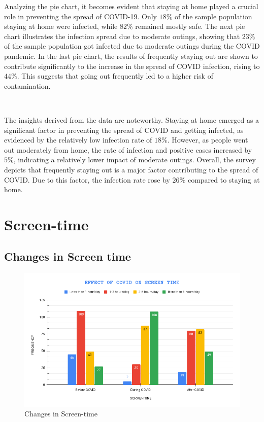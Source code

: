 \newpage 

Analyzing the pie chart, it becomes evident that staying at home played a crucial role in preventing the spread of COVID-19. Only $18\%$ of the sample population staying at home were infected, while $82\%$ remained mostly safe. The next pie chart illustrates the infection spread due to moderate outings, showing that $23\%$ of the sample population got infected due to moderate outings during the COVID pandemic. In the last pie chart, the results of frequently staying out are shown to contribute significantly to the increase in the spread of COVID infection, rising to $44\%$. This suggests that going out frequently led to a higher risk of contamination.

\ 

The insights derived from the data are noteworthy. Staying at home emerged as a significant factor in preventing the spread of COVID and getting infected, as evidenced by the relatively low infection rate of $18\%$. However, as people went out moderately from home, the rate of infection and positive cases increased by $5\%$, indicating a relatively lower impact of moderate outings. Overall, the survey depicts that frequently staying out is a major factor contributing to the spread of COVID. Due to this factor, the infection rate rose by $26\%$ compared to staying at home.

\newpage 

\section{Screen-time}

\subsection{Changes in Screen time}

\begin{figure}[h!]
	\centering

 \includegraphics[width=0.75\linewidth]{IMAGES/Image 16.png}
	\caption{Changes in Screen-time}
	\label{G16}
\end{figure}

